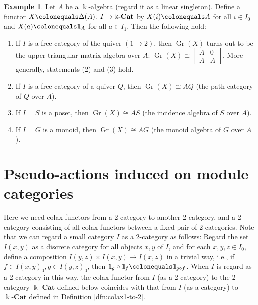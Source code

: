 \documentclass{surv-l}
\numberwithin{equation}{chapter}
\numberwithin{figure}{chapter}
\theoremstyle{plain}
\theoremstyle{definition}
\newtheorem{exm}[thm]{Example}
\theoremstyle{remark}
\newcommand{\id}{1\kern-.25em{\text{{\rm l}}}}
\newcommand{\kCat}{\Bbbk\text{-}\mathbf{Cat}}
\DeclareMathOperator{\Gr}{Gr}
\begin{document}
\begin{exm}\label{exm:Gr-const}
Let $A$ be a $\Bbbk$-algebra (regard it as a linear singleton).
Define a functor $X\colonequals  \Delta(A) \colon I \to \kCat$ by
$X(i)\colonequals A$ for all $i \in I_0$ and $X(a)\colonequals \id_A$ for all $a \in I_1$.
Then the following hold:
\begin{enumerate}
\item
If $I$ is a free category of the quiver $(1 \to 2)$, then
$\Gr(X)$ turns out to be the upper triangular matrix algebra over $A$:
$\Gr(X) \cong \begin{bmatrix} A&0\\A&A \end{bmatrix}$.
More generally, statements (2) and (3) hold.
\item
If $I$ is a free category of a quiver $Q$, then
$\Gr(X) \cong AQ$ (the path-category of $Q$ over $A$).
\item
If $I = S$ is a poset, then
$\Gr(X) \cong AS$ (the incidence algebra of $S$ over $A$). \item
If $I =G$ is a monoid, then
$\Gr(X) \cong AG$ (the monoid algebra of $G$ over $A$).
\end{enumerate}
\end{exm}

\section{Pseudo-actions induced on module categories}Here we need colax functors from a 2-category to another 2-category,
and a 2-category consisting of all colax functors between a fixed pair of 2-categories.
Note that we can regard a small category $I$ as a 2-category
as follows:
Regard the set $I(x, y)$ as a discrete category for all objects $x, y$ of $I$,
and for each $x,y,z \in I_0$, define a composition
$I(y,z) \times I(x,y) \to I(x,z)$ in a trivial way, i.e.,
if $f \in I(x,y)_0, g \in I(y,z)_0$, then
$\id_g \circ \id_f\colonequals  \id_{g\circ f}$.
When $I$ is regard as a 2-category in this way,
the colax functor from $I$ (as a 2-category) to the 2-category $\kCat$ defined below
coincides with that from $I$ (as a category) to $\kCat$ defined in Definition \ref{dfn:colax1-to-2}.
\end{document}
